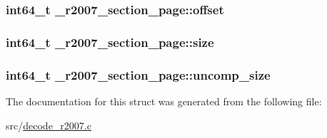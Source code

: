 \hypertarget{struct__r2007__section__page_aab7ece762680af8de36c7720cb1941e2}{
\subsubsection[{offset}]{\setlength{\rightskip}{0pt plus 5cm}int64\-\_\-t {\bf \-\_\-r2007\-\_\-section\-\_\-page\-::offset}}}\label{struct__r2007__section__page_aab7ece762680af8de36c7720cb1941e2}
\hypertarget{struct__r2007__section__page_a041ad864d0cd9efd3cf010ba79e15a94}{
\subsubsection[{size}]{\setlength{\rightskip}{0pt plus 5cm}int64\-\_\-t {\bf \-\_\-r2007\-\_\-section\-\_\-page\-::size}}}\label{struct__r2007__section__page_a041ad864d0cd9efd3cf010ba79e15a94}
\hypertarget{struct__r2007__section__page_aee477bed59a2c80e0644c502ed195f80}{
\subsubsection[{uncomp\-\_\-size}]{\setlength{\rightskip}{0pt plus 5cm}int64\-\_\-t {\bf \-\_\-r2007\-\_\-section\-\_\-page\-::uncomp\-\_\-size}}}\label{struct__r2007__section__page_aee477bed59a2c80e0644c502ed195f80}


\-The documentation for this struct was generated from the following file\-:\begin{DoxyCompactItemize}
\item 
src/\hyperlink{decode__r2007_8c}{decode\-\_\-r2007.\-c}\end{DoxyCompactItemize}
